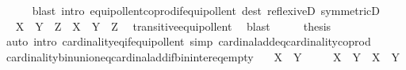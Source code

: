 \begin{isabellebody}
\ \ \ \ \isamarkupfalse%
\ {\isacharparenleft}{\kern0pt}blast\ intro{\isacharcolon}{\kern0pt}\ equipollent{\isacharunderscore}{\kern0pt}coprod{\isacharunderscore}{\kern0pt}if{\isacharunderscore}{\kern0pt}equipollent\ dest{\isacharcolon}{\kern0pt}\ reflexiveD\ symmetricD{\isacharparenright}{\kern0pt}\isanewline
\ \ \isamarkupfalse%
\ \isamarkupfalse%
\ {\isachardoublequoteopen}{\isacharbar}{\kern0pt}{\isacharparenleft}{\kern0pt}X\ {\isasymCoprod}\ Y{\isacharparenright}{\kern0pt}{\isacharbar}{\kern0pt}\ {\isasymCoprod}\ Z\ {\isasymapprox}\ X\ {\isasymCoprod}\ {\isacharbar}{\kern0pt}Y\ {\isasymCoprod}\ Z{\isacharbar}{\kern0pt}{\isachardoublequoteclose}\ \isamarkupfalse%
\ transitive{\isacharunderscore}{\kern0pt}equipollent\ \isamarkupfalse%
\ blast\isanewline
\ \ \isamarkupfalse%
\ \isamarkupfalse%
\ {\isacharquery}{\kern0pt}thesis\isanewline
\ \ \ \ \isamarkupfalse%
\ {\isacharparenleft}{\kern0pt}auto\ intro{\isacharcolon}{\kern0pt}\ cardinality{\isacharunderscore}{\kern0pt}eq{\isacharunderscore}{\kern0pt}if{\isacharunderscore}{\kern0pt}equipollent\ simp{\isacharcolon}{\kern0pt}\ cardinal{\isacharunderscore}{\kern0pt}add{\isacharunderscore}{\kern0pt}eq{\isacharunderscore}{\kern0pt}cardinality{\isacharunderscore}{\kern0pt}coprod{\isacharparenright}{\kern0pt}\isanewline
{}\isamarkupfalse%
%
\endisatagproof
{\isafoldproof}%
%
\isadelimproof
\isanewline
%
\endisadelimproof
\isanewline
{}\isamarkupfalse%
\ cardinality{\isacharunderscore}{\kern0pt}bin{\isacharunderscore}{\kern0pt}union{\isacharunderscore}{\kern0pt}eq{\isacharunderscore}{\kern0pt}cardinal{\isacharunderscore}{\kern0pt}add{\isacharunderscore}{\kern0pt}if{\isacharunderscore}{\kern0pt}bin{\isacharunderscore}{\kern0pt}inter{\isacharunderscore}{\kern0pt}eq{\isacharunderscore}{\kern0pt}empty{\isacharcolon}{\kern0pt}\isanewline
\ \ \ {\isachardoublequoteopen}X\ {\isasyminter}\ Y\ {\isacharequal}{\kern0pt}\ {\isacharbraceleft}{\kern0pt}{\isacharbraceright}{\kern0pt}{\isachardoublequoteclose}\isanewline
\ \ \ {\isachardoublequoteopen}{\isacharbar}{\kern0pt}X\ {\isasymunion}\ Y{\isacharbar}{\kern0pt}\ {\isacharequal}{\kern0pt}\ {\isacharbar}{\kern0pt}X{\isacharbar}{\kern0pt}\ {\isasymoplus}\ {\isacharbar}{\kern0pt}Y{\isacharbar}{\kern0pt}{\isachardoublequoteclose}\isanewline
%
\isadelimproof
%
\endisadelimproof
%
\isatagproof
{}\isamarkupfalse%
\ {\isacharminus}{\kern0pt}\isanewline
\ \ \isamarkupfalse%

\end{isabellebody}
